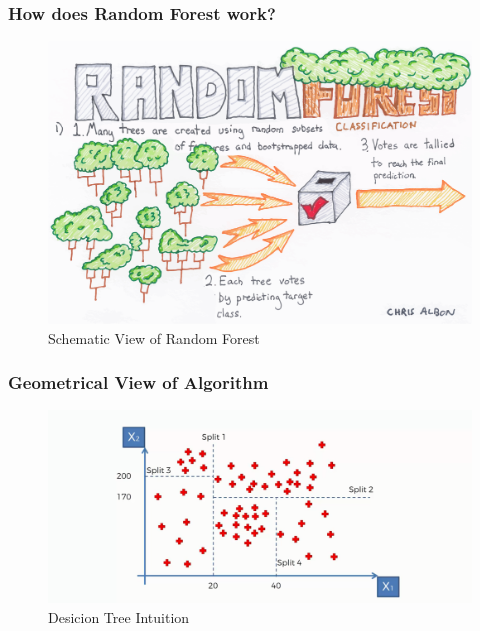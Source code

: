 \documentclass{beamer}
\begin{document}
\begin{frame}
	\frametitle{How does Random Forest work?}
    \begin{figure}
        \includegraphics[scale=0.15]{img/Random_Forest.png}
        \caption*{Schematic View of Random Forest}
    \end{figure}
    \end{frame}
\begin{frame}
	\frametitle{Geometrical View of  Algorithm}
    \begin{figure}
        \includegraphics[scale=0.35]{img/decision_tree_intuition.png}
        \caption*{Desicion Tree Intuition}
    \end{figure}
    \end{frame}
\end{document}

